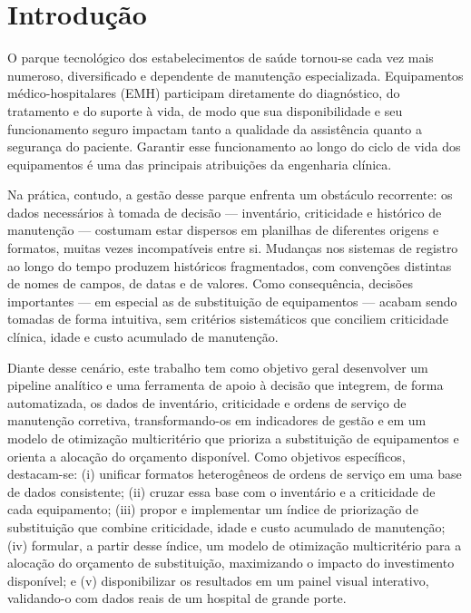 \chapter{Introdução}
\label{chapter:introducao}

O parque tecnológico dos estabelecimentos de saúde tornou-se cada vez mais
numeroso, diversificado e dependente de manutenção especializada. Equipamentos
médico-hospitalares (EMH) participam diretamente do diagnóstico, do tratamento e
do suporte à vida, de modo que sua disponibilidade e seu funcionamento seguro
impactam tanto a qualidade da assistência quanto a segurança do paciente.
Garantir esse funcionamento ao longo do ciclo de vida dos equipamentos é uma das
principais atribuições da engenharia clínica.

Na prática, contudo, a gestão desse parque enfrenta um obstáculo recorrente: os
dados necessários à tomada de decisão --- inventário, criticidade e histórico de
manutenção --- costumam estar dispersos em planilhas de diferentes origens e
formatos, muitas vezes incompatíveis entre si. Mudanças nos sistemas de registro
ao longo do tempo produzem históricos fragmentados, com convenções distintas de
nomes de campos, de datas e de valores. Como consequência, decisões importantes
--- em especial as de substituição de equipamentos --- acabam sendo tomadas de
forma intuitiva, sem critérios sistemáticos que conciliem criticidade clínica,
idade e custo acumulado de manutenção.

Diante desse cenário, este trabalho tem como objetivo geral desenvolver um
pipeline analítico e uma ferramenta de apoio à decisão que integrem, de forma
automatizada, os dados de inventário, criticidade e ordens de serviço de
manutenção corretiva, transformando-os em indicadores de gestão e em um modelo de
otimização multicritério que prioriza a substituição de equipamentos e orienta a
alocação do orçamento disponível. Como objetivos específicos, destacam-se: (i)
unificar formatos heterogêneos de ordens de serviço em uma base de dados
consistente; (ii) cruzar essa base com o inventário e a criticidade de cada
equipamento; (iii) propor e implementar um índice de priorização de substituição
que combine criticidade, idade e custo acumulado de manutenção; (iv) formular, a
partir desse índice, um modelo de otimização multicritério para a alocação do
orçamento de substituição, maximizando o impacto do investimento disponível; e
(v) disponibilizar os resultados em um painel visual interativo, validando-o com
dados reais de um hospital de grande porte.

